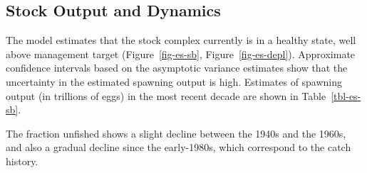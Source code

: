 \documentclass[
  english,
]{article}
\begin{document}
\subsection*{Stock Output and Dynamics}\label{stock-output-and-dynamics}

The model estimates that the stock complex currently is in a healthy
state, well above management target (Figure~\ref{fig-es-sb},
Figure~\ref{fig-es-depl}). Approximate confidence intervals based on the
asymptotic variance estimates show that the uncertainty in the estimated
spawning output is high. Estimates of spawning output (in trillions of
eggs) in the most recent decade are shown in Table~\ref{tbl-es-sb}.

The fraction unfished shows a slight decline between the 1940s and the
1960s, and also a gradual decline since the early-1980s, which
correspond to the catch history.

\newpage

\begingroup
\fontsize{9.0pt}{11.0pt}\selectfont
\end{document}
